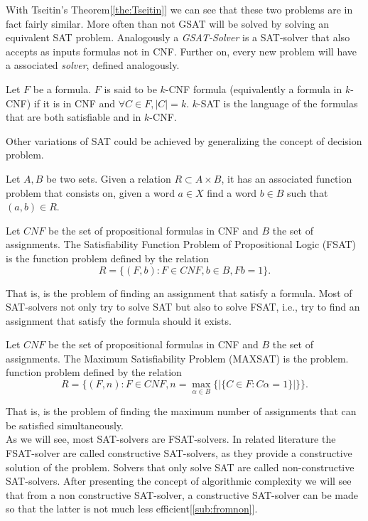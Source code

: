 With Tseitin's Theorem[\ref{the:Tseitin}] we can see that these two problems are in fact fairly similar. More often than not GSAT will be solved by solving an equivalent SAT problem. Analogously a \emph{GSAT-Solver}  is a SAT-solver that also accepts as inputs formulas not in CNF. Further on, every new problem will have a associated \emph{solver}, defined analogously.



\begin{definition}
  Let $F$ be a formula. $F$ is said to be $k$-CNF formula (equivalently a formula in $k$-CNF) if it is in CNF and $\forall C \in F, |C| = k$. $k$-SAT is the language of the formulas that are both satisfiable and in $k$-CNF.
\end{definition}

Other variations of SAT could be achieved by generalizing the concept of decision problem.

\begin{definition}
  Let $A,B$ be two sets. Given a relation $R\subset A\times B$, it has an associated function problem that consists on, given a word $a\in X$ find a word $b\in B$ such that $(a,b)\in R$.
\end{definition}

\begin{definition}
  Let $CNF$ be the set of propositional formulas in CNF and $B$ the set of assignments.  The Satisfiability Function Problem of Propositional Logic (FSAT) is the function problem defined by the relation $$R=\{(F, b): F\in CNF, b \in B, Fb = 1\}.$$
\end{definition}
That is, is the problem of finding an assignment that satisfy a formula. Most of SAT-solvers not only try to solve SAT but also to solve FSAT, i.e., try to find an assignment that satisfy  the formula should it exists.
\begin{definition}
  Let $CNF$ be the set of propositional formulas in CNF and $B$ the set of assignments. The Maximum Satisfiability Problem (MAXSAT) is the problem. function problem defined by the relation $$R=\{(F,n) : F\in CNF, n = \max_{\alpha \in B}\{ | \{C\in F : C\alpha =1 \}| \}\}.$$
\end{definition}

That is, is the problem of finding the maximum number of assignments that can be satisfied simultaneously.\\

As we will see, most SAT-solvers are FSAT-solvers. In related literature the FSAT-solver are called constructive SAT-solvers, as they provide a constructive solution of the problem. Solvers that only solve SAT are called non-constructive SAT-solvers. After presenting the concept of algorithmic complexity we will see that from a non constructive SAT-solver, a constructive SAT-solver can be made so that the latter is not much less efficient[\ref{sub:fromnon}].


